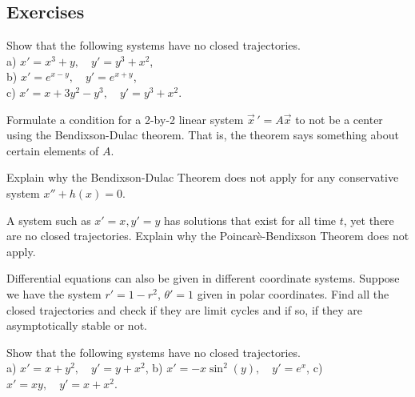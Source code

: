 \subsection{Exercises}

\begin{exercise}
Show that the following systems have no closed trajectories. \\
a) $x'=x^3+y,\quad y'=y^3+x^2$, \\
b) $x'=e^{x-y},\quad y'=e^{x+y}$, \\
c) $x'=x+3y^2-y^3,\quad y'=y^3+x^2$.
\end{exercise}

\begin{exercise}
Formulate a condition for a 2-by-2 linear system
${\vec{x}\,}' = A \vec{x}$ to not be a center using the Bendixson-Dulac theorem.
That is, the theorem says something about certain elements of $A$.
\end{exercise}

\begin{exercise}
Explain why the Bendixson-Dulac Theorem does not apply for any conservative
system $x''+h(x) = 0$.
\end{exercise}

\begin{exercise}
A system such as $x'=x, y'=y$ has solutions that exist for all time $t$,
yet there are no closed trajectories.  Explain
why the Poincar\`e-Bendixson Theorem does not apply.
\end{exercise}

\begin{exercise}
Differential equations can also be given in different coordinate systems.  
Suppose we have the system $r' = 1-r^2$, $\theta' = 1$ given
in polar coordinates.  Find all the closed trajectories and check if they
are limit cycles and if so, if they are asymptotically stable or not.
\end{exercise}


\setcounter{exercise}{100}

\begin{exercise}
Show that the following systems have no closed trajectories. \\
a) $x'=x+y^2,\quad y'=y+x^2$, \qquad
b) $x'=-x\sin^2(y),\quad y'=e^x$, \qquad
c) $x'=xy,\quad y'=x+x^2$.
\end{exercise}

